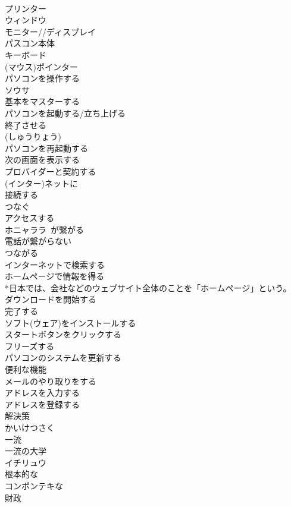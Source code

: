 \documentclass[8pt]{extreport}
\begin{document}
\begin{CJK}{UTF8}{min}
\\	プリンター	
\\	ウィンドウ	
\\	モニター//ディスプレイ	
\\	パスコン本体	
\\	キーボード	
\\	(マウス)ポインター	
\\	パソコンを操作する	
\\	ソウサ
\\	基本をマスターする	
\\	パソコンを起動する/立ち上げる 
\\	終了させる	
\\	(しゅうりょう)
\\	パソコンを再起動する	
\\	次の画面を表示する	
\\	プロバイダーと契約する	
\\	(インター)ネットに 
\\	接続する 
\\	つなぐ 
\\	アクセスする	
\\	ホニャララ~が繋がる 
\\	電話が繋がらない	
\\	つながる
\\	インターネットで検索する	
\\	ホームページで情報を得る	
\\	*日本では、会社などのウェブサイト全体のことを「ホームページ」という。
\\	ダウンロードを開始する 
\\	完了する	
\\	ソフト(ウェア)をインストールする	
\\	スタートボタンをクリックする	
\\	フリーズする	
\\	パソコンのシステムを更新する	
\\	便利な機能	
\\	メールのやり取りをする	
\\	アドレスを入力する	
\\	アドレスを登録する	
\\	解決策	
\\	かいけつさく
\\	一流 
\\	一流の大学	
\\	イチリュウ
\\	根本的な	
\\	コンポンテキな
\\	財政	

\end{CJK}
\end{document}
